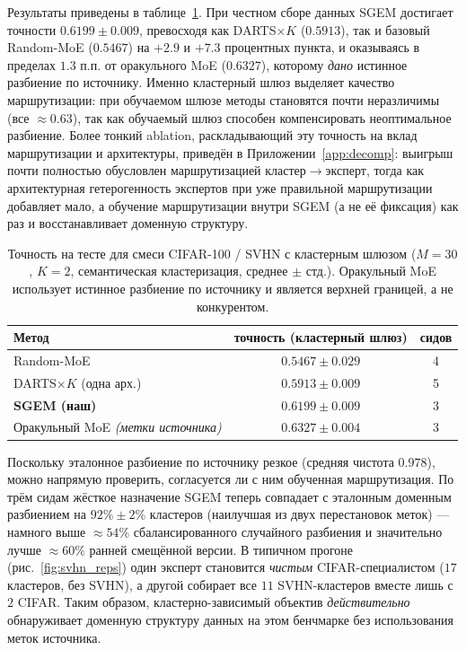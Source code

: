 Результаты приведены в таблице~\ref{tab:cifar_main}. При честном сборе
данных SGEM достигает точности $0.6199 \pm 0.009$, превосходя как
DARTS$\times K$ ($0.5913$), так и базовый Random-MoE ($0.5467$) на
$+2.9$ и $+7.3$ процентных пункта, и оказываясь в пределах $1.3$ п.п. от
оракульного MoE ($0.6327$), которому \emph{дано} истинное разбиение по
источнику. Именно кластерный шлюз выделяет качество маршрутизации: при
обучаемом шлюзе методы становятся почти неразличимы (все $\approx\!0.63$),
так как обучаемый шлюз способен компенсировать неоптимальное разбиение.
Более тонкий ablation, раскладывающий эту точность на вклад
маршрутизации и архитектуры, приведён в Приложении~\ref{app:decomp}:
выигрыш почти полностью обусловлен маршрутизацией кластер$\to$эксперт,
тогда как архитектурная гетерогенность экспертов при уже правильной
маршрутизации добавляет мало, а обучение маршрутизации внутри SGEM (а не
её фиксация) как раз и восстанавливает доменную структуру.

\begin{table}[h]
\centering
\caption{Точность на тесте для смеси CIFAR-100 / SVHN с кластерным шлюзом
($M=30$, $K=2$, семантическая кластеризация, среднее $\pm$ стд.).
Оракульный MoE использует истинное разбиение по источнику и является
верхней границей, а не конкурентом.}
\label{tab:cifar_main}
\begin{tabular}{lcc}
\toprule
Метод & точность (кластерный шлюз) & сидов \\
\midrule
Random-MoE & $0.5467 \pm 0.029$ & 4 \\
DARTS$\times K$ (одна арх.) & $0.5913 \pm 0.009$ & 5 \\
\textbf{SGEM (наш)} & $\mathbf{0.6199 \pm 0.009}$ & 3 \\
\midrule
Оракульный MoE \emph{(метки источника)} & $0.6327 \pm 0.004$ & 3 \\
\bottomrule
\end{tabular}
\end{table}

Поскольку эталонное разбиение по источнику резкое (средняя чистота
$0.978$), можно напрямую проверить, согласуется ли с ним обученная
маршрутизация. По трём сидам жёсткое назначение SGEM теперь совпадает с
эталонным доменным разбиением на $92\% \pm 2\%$ кластеров (наилучшая из
двух перестановок меток) --- намного выше $\approx\!54\%$ сбалансированного
случайного разбиения и значительно лучше $\approx\!60\%$ ранней смещённой
версии. В типичном прогоне (рис.~\ref{fig:svhn_reps}) один эксперт
становится \emph{чистым} CIFAR-специалистом ($17$ кластеров, без SVHN), а
другой собирает все $11$ SVHN-кластеров вместе лишь с $2$ CIFAR. Таким
образом, кластерно-зависимый объектив \emph{действительно} обнаруживает
доменную структуру данных на этом бенчмарке без использования меток
источника.

